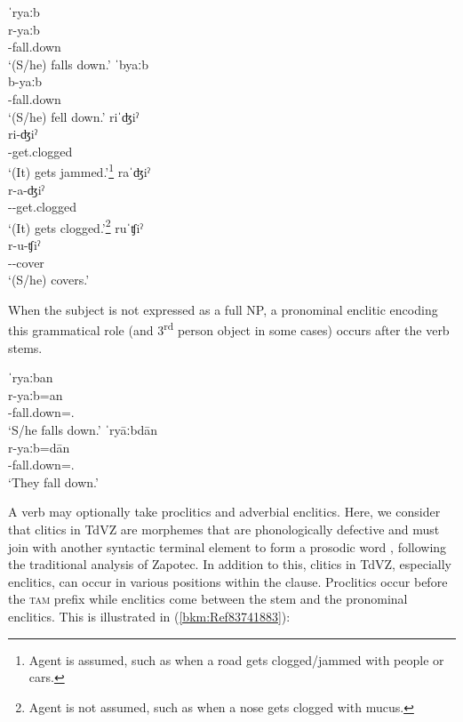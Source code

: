 \documentclass[output=paper]{langscibook}
\begin{document}
\ea \label{bkm:Ref82093090}
{ˈryaːb} \\ 
\gll r-yaːb \\
\Hab{}-fall.down \\ 
\glt `(S/he) falls down.' 
\pagebreak
\ex \label{ex:key:zap:3} 
{ˈbyaːb} \\
\gll b-yaːb \\ 
\Compl{}-fall.down \\ 
\glt `(S/he) fell down.'
\ex \label{bkm:Ref82093093} 
{riˈʤiˀ} \\ 
\gll ri-ʤiˀ  \\ 
\Hab{}-get.clogged \\ 
\glt `(It) gets jammed.'\footnote{Agent is assumed, such as when a road gets clogged/jammed with people or cars.}
\ex \label{bkm:Ref82093104}
{raˈʤiˀ} \\ 
\gll r-a-ʤiˀ \\ 
 \Hab{}-\Rest{}-get.clogged \\ 
 \glt `(It) gets clogged.'\footnote{Agent is not assumed, such as when a nose gets clogged with mucus.}
\ex \label{bkm:Ref82093107} 
 {ruˈʧiˀ} \\ 
\gll r-u-ʧiˀ \\ 
\Hab{}-\Caus{}-cover \\ 
\glt `(S/he) covers.' 
\z 

When the subject is not expressed as a full NP, a pronominal enclitic encoding this grammatical role (and 3\textsuperscript{rd} person object in some cases) occurs after the verb stems.

\ea\label{ex:key:zap:7}
{ˈryaːban}\\
\gll r-yaːb=an\\
\Hab{}-fall.down=\Third\Sg{}.\Inf{}\\
\glt `S/he falls down.' 
\ex
{ˈryāːbdān} \\ %
\gll r-yaːb=dān\\
\Hab{}-fall.down=\Third\Pl{}.\For{}\\
\glt `They fall down.'
\z

A verb may optionally take proclitics and adverbial enclitics.  Here, we consider that clitics in TdVZ are morphemes that are phonologically defective and must join with another syntactic terminal element to form a prosodic word \citep[71]{Sapir1930}, following the traditional analysis of Zapotec. In addition to this, clitics in TdVZ, especially enclitics, can occur in various positions within the clause. Proclitics occur before the \textsc{tam} prefix while enclitics come between the stem and the pronominal enclitics. This is illustrated in (\ref{bkm:Ref83741883}):
\end{document}
